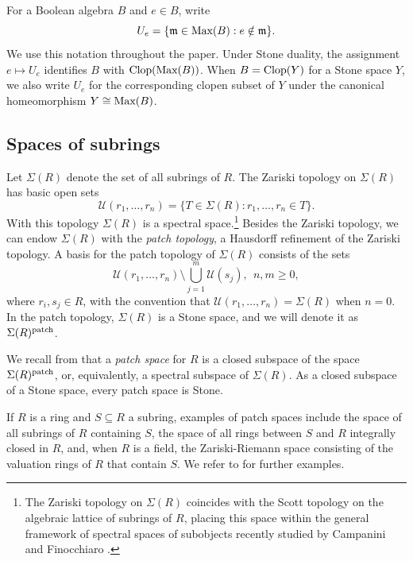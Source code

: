 \documentclass[11pt]{amsart}
\begin{document}
For a Boolean algebra $B$ and $e\in B$, write
$$U_e=\{\mathfrak m\in\mbox{\rm Max}(B):e\notin\mathfrak m\}.$$
We use this notation throughout the paper. Under Stone duality, the assignment $e\mapsto U_e$ identifies $B$ with $\mbox{\rm Clop}(\mbox{\rm Max}(B))$. When $B=\mbox{\rm Clop}(Y)$ for a Stone space $Y$, we also write $U_e$ for the corresponding clopen subset of $Y$ under the canonical homeomorphism $Y\cong\mbox{\rm Max}(B)$. 

\subsection[Spaces of subrings]{Spaces of subrings}\label{subsec: spaces of subrings} Let $\Sigma(R)$ denote the set of all subrings of $R$. The Zariski topology on $\Sigma(R)$ has basic open sets
$$
\mathcal U(r_1,\ldots,r_n)=\{T\in\Sigma(R):r_1,\ldots,r_n\in T\}.
$$
With this topology $\Sigma(R)$ is a spectral space.\footnote{The Zariski topology on $\Sigma(R)$ coincides with the Scott topology on the algebraic lattice of subrings of $R$, placing this space within the general framework of spectral spaces of subobjects recently studied by Campanini and Finocchiaro \cite[Proposition~4.6 and Corollary~5.1]{CamFin26}.} Besides the Zariski topology, we can endow $\Sigma(R)$ with the {\it patch topology}, a Hausdorff refinement of the Zariski topology. A basis for the patch topology of $\Sigma(R)$ consists of the sets
$$
\mathcal U(r_1,\ldots,r_n)\setminus \bigcup_{j=1}^{m}\mathcal U(s_j), \:\: n,m\geq 0,$$ where $r_i,s_j\in R$, with the convention that $\mathcal U(r_1,\ldots,r_n)=\Sigma(R)$ when $n=0$. In the patch topology, $\Sigma(R)$ is a Stone space, and we will denote it as ${\Sigma}(R)^{\rm patch}$.

We recall from \cite[Definition 3.2 and Proposition 3.1]{CosOlb} that a {\it patch space} for $R$ is a closed subspace of the space ${\Sigma}(R)^{\rm patch}$, or, equivalently, a spectral subspace of $\Sigma(R)$. As a closed subspace of a Stone space, every patch space is Stone.

If $R$ is a ring and $S\subseteq R$ a subring, examples of patch spaces include the space of all subrings of $R$ containing $S$, the space of all rings between $S$ and $R$ integrally closed in $R$, and, when $R$ is a field, the Zariski-Riemann space consisting of the valuation rings of $R$ that contain $S$. We refer to \cite[Example 3.3]{CosOlb} for further examples. 
\end{document}
